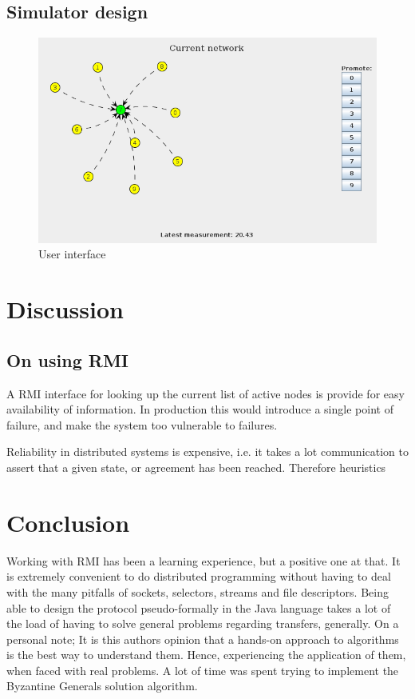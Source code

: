 \documentclass[10pt,a4paper]{article}
\begin{document}
\subsection{Simulator design}
\begin{figure}[h]
\centering
\includegraphics[scale=0.4]{fig/UI.png}
 \caption{User interface}
 \label{fig:ui}
\end{figure}


\section{Discussion}
\subsection{On using RMI}
A RMI interface for looking up the current list of active nodes is provide for easy availability of information. In production this would introduce a single point of failure, and make the system too vulnerable to failures.

Reliability in distributed systems is expensive, i.e. it takes a lot communication to assert that a given state, or agreement has been reached. Therefore heuristics

\section{Conclusion}
Working with RMI has been a learning experience, but a positive one at that. It is extremely convenient to do distributed programming without having to deal with the many pitfalls of sockets, selectors, streams and file descriptors. Being able to design the protocol pseudo-formally in the Java language takes a lot of the load of having to solve general problems regarding transfers, generally.
On a personal note; It is this authors opinion that a hands-on approach to algorithms is the best way to understand them. Hence, experiencing the application of them, when faced with real problems.
A lot of time was spent trying to implement the Byzantine Generals solution algorithm.
\end{document}
